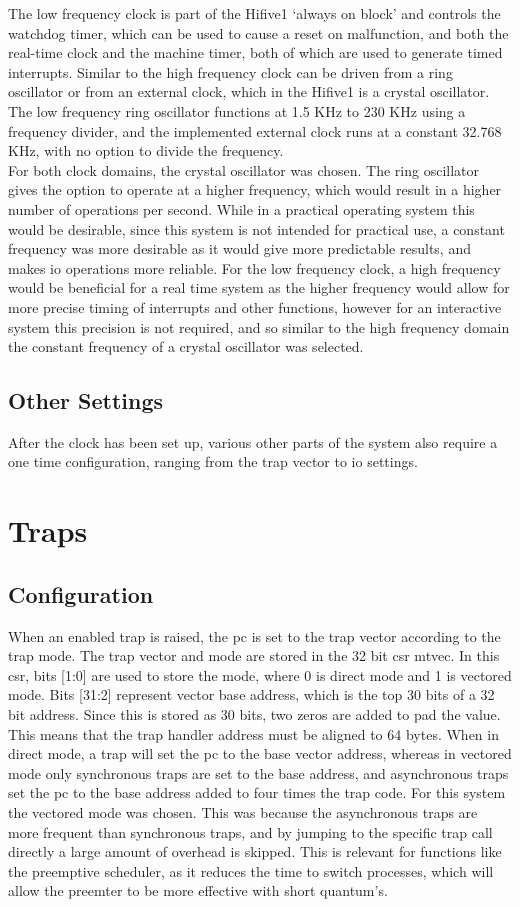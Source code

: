 The low frequency clock is part of the Hifive1 `always on block' and controls the watchdog timer, which can be used to cause a reset on malfunction, and both the real-time clock and the machine timer, both of which are used to generate timed interrupts. Similar to the high frequency clock can be driven from a ring oscillator or from an external clock, which in the Hifive1 is a crystal oscillator. The low frequency ring oscillator functions at 1.5 KHz to 230 KHz using a frequency divider, and the implemented external clock runs at a constant 32.768 KHz, with no option to divide the frequency.
\\
For both clock domains, the crystal oscillator was chosen. The ring oscillator gives the option to operate at a higher frequency, which would result in a higher number of operations per second. While in a practical operating system this would be desirable, since this system is not intended for practical use, a constant frequency was more desirable as it would give more predictable results, and makes \ac{io} operations more reliable. For the low frequency clock, a high frequency would be beneficial for a real time system as the higher frequency would allow for more precise timing of interrupts and other functions, however for an interactive system this precision is not required, and so similar to the high frequency domain the constant frequency of a crystal oscillator was selected.
\subsection{Other Settings}
After the clock has been set up, various other parts of the system also require a one time configuration, ranging from the trap vector to \ac{io} settings.
\section{Traps}
\subsection{Configuration}
When an enabled trap is raised, the pc is set to the trap vector according to the trap mode. The trap vector and mode are stored in the 32 bit csr mtvec. In this csr, bits [1:0] are used to store the mode, where 0 is direct mode and 1 is vectored mode. Bits [31:2] represent vector base address, which is the top 30 bits of a 32 bit address. Since this is stored as 30 bits, two zeros are added to pad the value. This means that the trap handler address must be aligned to 64 bytes. When in direct mode, a trap will set the pc to the base vector address, whereas in vectored mode only synchronous traps are set to the base address, and asynchronous traps set the pc to the base address added to four times the trap code. For this system the vectored mode was chosen. This was because the asynchronous traps are more frequent than synchronous traps, and by jumping to the specific trap call directly a large amount of overhead is skipped. This is relevant for functions like the preemptive scheduler, as it reduces the time to switch processes, which will allow the preemter to be more effective with short quantum's.
